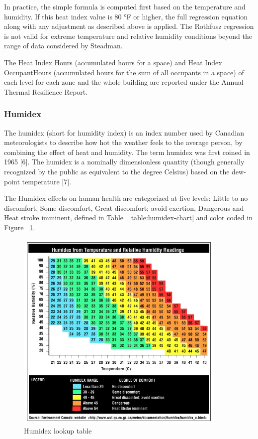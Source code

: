 In practice, the simple formula is computed first based on the temperature and humidity. If this heat index value is 80 °F or higher, the full regression equation along with any adjustment as described above is applied. The Rothfusz regression is not valid for extreme temperature and relative humidity conditions beyond the range of data considered by Steadman.

The Heat Index Hours (accumulated hours for a space) and Heat Index OccupantHours (accumulated hours for the sum of all occupants in a space) of each level for each zone and the whole building are reported under the Annual Thermal Resilience Report.

\subsubsection{Humidex}\label{humidex}

The humidex (short for humidity index) is an index number used by Canadian meteorologists to describe how hot the weather feels to the average person, by combining the effect of heat and humidity. The term humidex was first coined in 1965 [6]. The humidex is a nominally dimensionless quantity (though generally recognized by the public as equivalent to the degree Celsius) based on the dew-point temperature [7].

The Humidex effects on human health are categorized at five levels: Little to no discomfort, Some discomfort, Great discomfort; avoid exertion, Dangerous and Heat stroke imminent, defined in Table ~\ref{table:humidex-chart} and color coded in Figure ~\ref{fig:humidex-lookup-table}.

\begin{figure}[hbtp] 
\centering
\includegraphics[width=0.9\textwidth, height=0.9\textheight, keepaspectratio=true]{media/humidex_chart.jpg}
\caption{Humidex lookup table \protect \label{fig:humidex-lookup-table}}
\end{figure}

